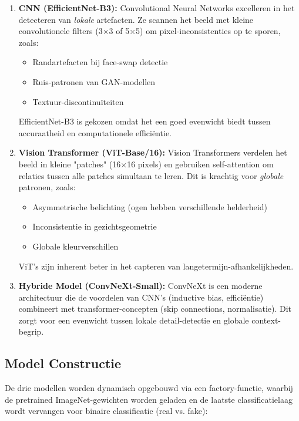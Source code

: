 \begin{enumerate}
    \item \textbf{CNN (EfficientNet-B3):} 
    Convolutional Neural Networks excelleren in het detecteren van \textit{lokale} artefacten. Ze scannen het beeld met kleine convolutionele filters (3×3 of 5×5) om pixel-inconsistenties op te sporen, zoals:
    \begin{itemize}
        \item Randartefacten bij face-swap detectie
        \item Ruis-patronen van GAN-modellen
        \item Textuur-discontinuïteiten
    \end{itemize}
    EfficientNet-B3 is gekozen omdat het een goed evenwicht biedt tussen accuraatheid en computationele efficiëntie.
    
    \item \textbf{Vision Transformer (ViT-Base/16):}
    Vision Transformers verdelen het beeld in kleine "patches" (16×16 pixels) en gebruiken self-attention om relaties tussen alle patches simultaan te leren. Dit is krachtig voor \textit{globale} patronen, zoals:
    \begin{itemize}
        \item Asymmetrische belichting (ogen hebben verschillende helderheid)
        \item Inconsistentie in gezichtsgeometrie
        \item Globale kleurverschillen
    \end{itemize}
    ViT's zijn inherent beter in het capteren van langetermijn-afhankelijkheden.
    
    \item \textbf{Hybride Model (ConvNeXt-Small):}
    ConvNeXt is een moderne architectuur die de voordelen van CNN's (inductive bias, efficiëntie) combineert met transformer-concepten (skip connections, normalisatie). Dit zorgt voor een evenwicht tussen lokale detail-detectie en globale context-begrip.
\end{enumerate}

\subsection{Model Constructie}

De drie modellen worden dynamisch opgebouwd via een factory-functie, waarbij de pretrained ImageNet-gewichten worden geladen en de laatste classificatielaag wordt vervangen voor binaire classificatie (real vs. fake):

